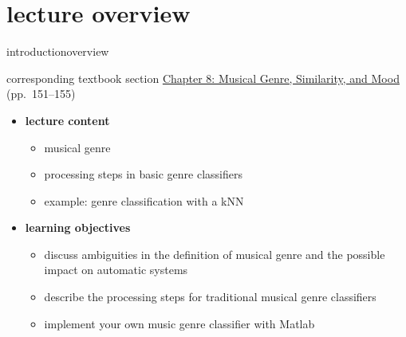 




\subtitle{Module 8.1: Musical Genre Classification}


	

    \section[overview]{lecture overview}
        \begin{frame}{introduction}{overview}
            \begin{block}{corresponding textbook section}
                    \href{http://ieeexplore.ieee.org/xpl/articleDetails.jsp?arnumber=6331125}{Chapter 8: Musical Genre, Similarity, and Mood} (pp.~151--155)
            \end{block}

            \begin{itemize}
                \item   \textbf{lecture content}
                    \begin{itemize}
                        \item   musical genre
                        \item   processing steps in basic genre classifiers
                        \item   example: genre classification with a kNN
                    \end{itemize}
                \bigskip
                \item<2->   \textbf{learning objectives}
                    \begin{itemize}
                        \item   discuss ambiguities in the definition of musical genre and the possible impact on automatic systems
                        \item   describe the processing steps for traditional musical genre classifiers
                        \item   implement your own music genre classifier with Matlab
                    \end{itemize}
            \end{itemize}
        \end{frame}

